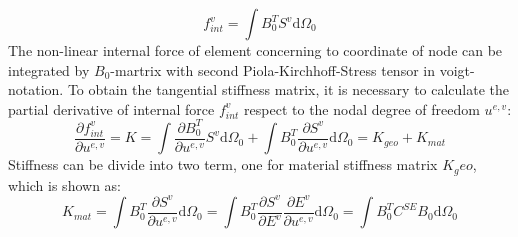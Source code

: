 \begin{equation}
f_{int}^v = \int B_0^T S^v \mathrm{d}\Omega_0
\end{equation}
The non-linear internal force of element concerning to coordinate of node can be integrated by $B_0$-martrix with second Piola-Kirchhoff-Stress tensor in voigt-notation. To obtain the tangential stiffness matrix, it is necessary to calculate the partial derivative of internal force $f_{int}^v$ respect to the nodal degree of freedom $u^{e,v}$:
\begin{equation}
\frac{\partial f_{int}^v}{\partial u^{e,v}} = K = \int \frac{\partial B_0^T}{\partial u^{e,v}} S^v \mathrm{d}\Omega_0 + \int B_0^T \frac{\partial S^v}{\partial u^{e,v}} \mathrm{d}\Omega_0 = K_{geo} + K_{mat}
\end{equation}
Stiffness can be divide into two term, one for material stiffness matrix $K_geo$, which is shown as:
\begin{equation}
K_{mat} = \int B_0^T \frac{\partial S^v}{\partial u^{e,v}}\mathrm{d}\Omega_0 = \int B_0^T\frac{\partial S^v}{\partial E^v} \frac{\partial E^v}{\partial u^{e,v}} \mathrm{d}\Omega_0 = \int B_0^T C^{SE}B_0 \mathrm{d}\Omega_0
\end{equation}



\cite[p. 18]{bibid}





